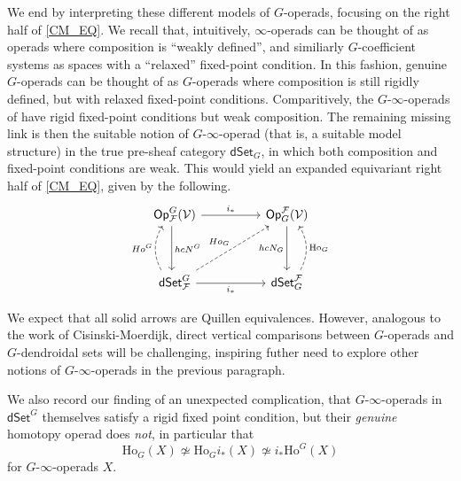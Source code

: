 \documentclass[a4paper,10pt]{article}%
\begin{document}
We end by interpreting these different models of $G$-operads, focusing on the right half of \ref{CM_EQ}. We recall that, intuitively, $\infty$-operads can be thought of as operads where composition is ``weakly defined'', and similiarly $G$-coefficient systems as spaces with a ``relaxed'' fixed-point condition. In this fashion, genuine $G$-operads can be thought of as $G$-operads where composition is still rigidly defined, but with relaxed fixed-point conditions. Comparitively, the $G$-$\infty$-operads of \cite{Pe17} have rigid fixed-point conditions but weak composition. The remaining missing link is then the suitable notion of $G$-$\infty$-operad (that is, a suitable model structure) in the true pre-sheaf category $\mathsf{dSet}_G$, in which both composition and fixed-point conditions are weak. This would yield an expanded equivariant right half of \ref{CM_EQ}, given by the following.
\[
\begin{tikzcd}
  \Op^G_{\mathcal F}(\V) \arrow[rr, "i_*"] \arrow[dd, shift right, "hcN^G"]& & \Op_G^{\mathcal F}(\V) \arrow[dd, "hcN_G"']\\ \\
  \mathsf{dSet}^G_{\mathcal F} \arrow[rr, "i_*"'] \arrow[uu, shift left, shift left, dashed, bend left, "Ho^G"] \arrow[uurr, "Ho_G", dashed] && \mathsf{dSet}_G^{\mathcal F} \arrow[uu, shift right, shift right, bend right, dashed, "\mathrm{Ho}_G"']
\end{tikzcd}
\]

We expect that all solid arrows are Quillen equivalences. However, analogous to the work of Cisinski-Moerdijk, direct vertical comparisons between $G$-operads and $G$-dendroidal sets will be challenging, inspiring futher need to explore other notions of $G$-$\infty$-operads in the previous paragraph. 

We also record our finding of an unexpected complication, that $G$-$\infty$-operads in $\mathsf{dSet}^G$ themselves satisfy a rigid fixed point condition, but their \textit{genuine} homotopy operad does \textit{not}, in particular that 
\[
\mathrm{Ho}_G(X) \not\simeq \mathrm{Ho}_G i_*(X) \not\simeq i_* \mathrm{Ho}^G(X)
\]
for $G$-$\infty$-operads $X$. 
\end{document}
